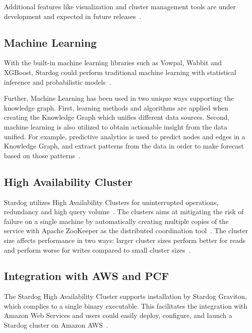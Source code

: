 		Additional features like visualization and cluster management tools are 
		under development and expected in future 
		releases~\cite{hid-sp18-405-www-stardog-studio}.

	\subsection{Machine Learning}
		With the built-in machine learning libraries such as Vowpal, Wabbit and 
		XGBoost, Stardog could perform traditional machine learning with 
		statistical	inference and probabilistic 
		models~\cite{hid-sp18-405-blog-stardog-xgboost}. 
		
		Further, Machine Learning has been used in two unique ways 
		supporting the knowledge graph. First, learning methods and algorithms 
		are applied when creating  the Knowledge Graph which unifies different 
		data sources. Second,  machine learning is also utilized to obtain 
		actionable insight from the data unified. For example, predictive 
		analytics is used to predict nodes and edges in a Knowledge Graph, and 
		extract patterns from the data in order to make forecast based on those 
		patterns~\cite{hid-sp18-405-blog-stardog-ml}.


	\subsection{High Availability Cluster}
		Stardog utilizes High Availability Clusters for uninterrupted operations, 
		redundancy and high query 
		volume~\cite{hid-sp18-405-www-stardog-docs}. 
		The clusters aims at mitigating the risk of failure on a single machine by 
		automatically creating multiple copies of the service with Apache 
		ZooKeeper as the distributed coordination 
		tool~\cite{hid-sp18-405-www-stardog-predictiveanalyticstoday}. The 
		cluster size affects performance in two ways: larger cluster sizes 
		perform better for reads and perform worse for writes compared to 
		small cluster sizes~\cite{hid-sp18-405-www-stardog-docs}. 

	\subsection{Integration with AWS and PCF}
		The Stardog High Availability Cluster supports installation by Stardog 
		Graviton, which complies to a single binary executable. This facilitates 
		the integration with Amazon Web Services and users could easily 
		deploy, configure, and launch a Stardog cluster on Amazon 
		AWS~\cite{hid-sp18-405-blog-stardog-aws}. 
		
